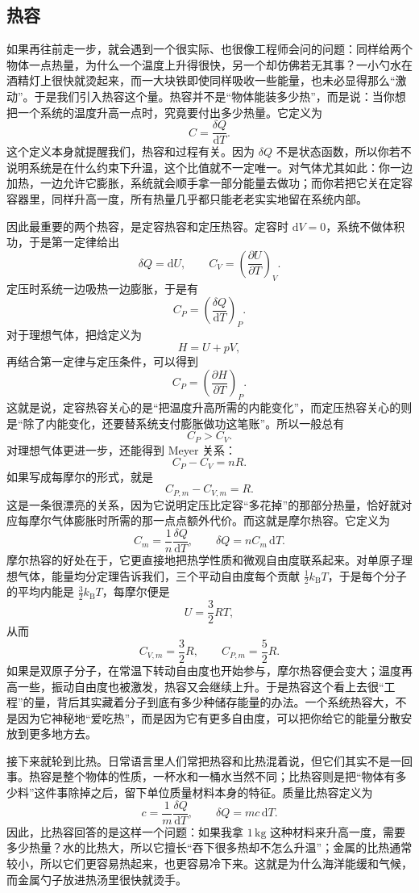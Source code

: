 \documentclass[UTF8]{ctexbook}
\begin{document}
\subsection{热容}

如果再往前走一步，就会遇到一个很实际、也很像工程师会问的问题：同样给两个物体一点热量，为什么一个温度上升得很快，另一个却仿佛若无其事？一小勺水在酒精灯上很快就烫起来，而一大块铁即使同样吸收一些能量，也未必显得那么“激动”。于是我们引入热容这个量。热容并不是“物体能装多少热”，而是说：当你想把一个系统的温度升高一点时，究竟要付出多少热量。它定义为
\[
C=\frac{\delta Q}{\mathrm dT}.
\]
这个定义本身就提醒我们，热容和过程有关。因为 \(\delta Q\) 不是状态函数，所以你若不说明系统是在什么约束下升温，这个比值就不一定唯一。对气体尤其如此：你一边加热，一边允许它膨胀，系统就会顺手拿一部分能量去做功；而你若把它关在定容容器里，同样升高一度，所有热量几乎都只能老老实实地留在系统内部。

因此最重要的两个热容，是定容热容和定压热容。定容时 \(\mathrm dV=0\)，系统不做体积功，于是第一定律给出
\[
\delta Q=\mathrm dU,
\qquad
C_V=\left(\frac{\partial U}{\partial T}\right)_V.
\]
定压时系统一边吸热一边膨胀，于是有
\[
C_P=\left(\frac{\delta Q}{\mathrm dT}\right)_P.
\]
对于理想气体，把焓定义为
\[
H=U+pV,
\]
再结合第一定律与定压条件，可以得到
\[
C_P=\left(\frac{\partial H}{\partial T}\right)_P.
\]
这就是说，定容热容关心的是“把温度升高所需的内能变化”，而定压热容关心的则是“除了内能变化，还要替系统支付膨胀做功这笔账”。所以一般总有
\[
C_P>C_V.
\]
对理想气体更进一步，还能得到 Meyer 关系：
\[
C_P-C_V=nR.
\]
如果写成每摩尔的形式，就是
\[
C_{P,m}-C_{V,m}=R.
\]
这是一条很漂亮的关系，因为它说明定压比定容“多花掉”的那部分热量，恰好就对应每摩尔气体膨胀时所需的那一点点额外代价。而这就是摩尔热容。它定义为
\[
C_m=\frac{1}{n}\frac{\delta Q}{\mathrm dT},
\qquad
\delta Q=nC_m\,\mathrm dT.
\]
摩尔热容的好处在于，它更直接地把热学性质和微观自由度联系起来。对单原子理想气体，能量均分定理告诉我们，三个平动自由度每个贡献 \(\frac12 k_{\mathrm B}T\)，于是每个分子的平均内能是 \(\frac32 k_{\mathrm B}T\)，每摩尔便是
\[
U=\frac32 RT,
\]
从而
\[
C_{V,m}=\frac32 R,
\qquad
C_{P,m}=\frac52 R.
\]
如果是双原子分子，在常温下转动自由度也开始参与，摩尔热容便会变大；温度再高一些，振动自由度也被激发，热容又会继续上升。于是热容这个看上去很“工程”的量，背后其实藏着分子到底有多少种储存能量的办法。一个系统热容大，不是因为它神秘地“爱吃热”，而是因为它有更多自由度，可以把你给它的能量分散安放到更多地方去。

接下来就轮到比热。日常语言里人们常把热容和比热混着说，但它们其实不是一回事。热容是整个物体的性质，一杯水和一桶水当然不同；比热容则是把“物体有多少料”这件事除掉之后，留下单位质量材料本身的特征。质量比热容定义为
\[
c=\frac{1}{m}\frac{\delta Q}{\mathrm dT},
\qquad
\delta Q=mc\,\mathrm dT.
\]
因此，比热容回答的是这样一个问题：如果我拿 \(1\,\mathrm{kg}\) 这种材料来升高一度，需要多少热量？水的比热大，所以它擅长“吞下很多热却不怎么升温”；金属的比热通常较小，所以它们更容易热起来，也更容易冷下来。这就是为什么海洋能缓和气候，而金属勺子放进热汤里很快就烫手。
\end{document}

